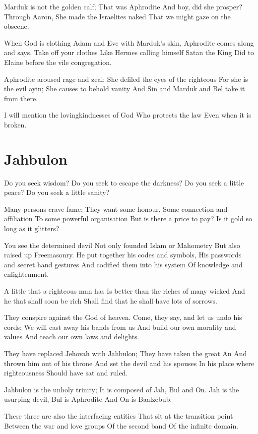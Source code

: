 \documentclass[
]{book}
\begin{document}
Marduk is not the golden calf;
That was Aphrodite
And boy, did she prosper?
Through Aaron,
She made the Israelites naked
That we might gaze on the obscene.

When God is clothing Adam and Eve with Marduk's skin,
Aphrodite comes along and says,
Take off your clothes
Like Hermes calling himself Satan the King
Did to Elaine before the vile congregation.

Aphrodite aroused rage and zeal;
She defiled the eyes of the righteous
For she is the evil ayin;
She causes to behold vanity
And Sin and Marduk and Bel take it from there.

I will mention the lovingkindnesses of God
Who protects the law
Even when it is broken.

\chapter{Jahbulon}\label{jahbulon}

Do you seek wisdom?
Do you seek to escape the darkness?
Do you seek a little peace?
Do you seek a little sanity?

Many persons crave fame;
They want some honour,
Some connection and affiliation
To some powerful organisation
But is there a price to pay?
Is it gold so long as it glitters?

You see the determined devil
Not only founded Islam or Mahometry
But also raised up Freemasonry.
He put together his codes and symbols,
His passwords and secret hand gestures
And codified them into his system
Of knowledge and enlightenment.

A little that a righteous man has
Is better than the riches of many wicked
And he that shall soon be rich
Shall find that he shall have lots of sorrows.

They conspire against the God of heaven.
Come, they say, and let us undo his cords;
We will cast away his bands from us
And build our own morality and values
And teach our own laws and delights.

They have replaced Jehovah with Jahbulon;
They have taken the great An
And thrown him out of his throne
And set the devil and his spouses
In his place where righteousness
Should have sat and ruled.

Jahbulon is the unholy trinity;
It is composed of Jah, Bul and On.
Jah is the usurping devil,
Bul is Aphrodite
And On is Baalzebub.

These three are also the interfacing entities
That sit at the transition point
Between the war and love groups
Of the second band
Of the infinite domain.
\end{document}
